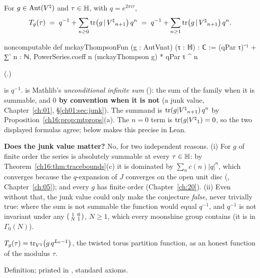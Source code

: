 \begin{definition}\label{ch16:def:mtfun}
For $g\in\operatorname{Aut}({V^{\natural}})$ and $\tau\in\mathbb{H}$, with $q=e^{2\pi i\tau}$,
\begin{equation*}
  T_g(\tau)\;=\;q^{-1}+\sum_{n\ge0}\operatorname{tr}\bigl(g\,|\,{V^{\natural}}_{n+1}\bigr)\,q^n
  \;=\;q^{-1}+\sum_{n\ge1}\operatorname{tr}\bigl(g\,|\,{V^{\natural}}_{n+1}\bigr)\,q^n .
\end{equation*}
\end{definition}
\begin{leancode}
noncomputable def mckayThompsonFun (g : AutVnat) (τ : ℍ) : ℂ :=
  (qPar τ)⁻¹ + ∑' n : ℕ, PowerSeries.coeff n (mckayThompson g) * qPar τ ^ n
\end{leancode}
(.)
\begin{dictionary}
 is $q^{-1}$.   is Mathlib's \emph{unconditional infinite sum} ():
the sum of the family when it is summable, and \textbf{$0$ by convention when it is not} (a junk value,
Chapter~\ref{ch:01}, \S\ref{ch01:sec:junk}).  The summand is $\operatorname{tr}(g|{V^{\natural}}_{n+1})\,q^n$ by
Proposition~\ref{ch16:prop:mtprops}(a).  The $n=0$ term is $\operatorname{tr}(g|{V^{\natural}}_1)=0$, so the two displayed formulas agree;
 below makes this precise in Lean.

\textbf{Does the junk value matter?}  No, for two independent reasons.  (i) For $g$ of finite order the series is
absolutely summable at every $\tau\in\mathbb{H}$: by Theorem~\ref{ch16:thm:tracebounds}(c) it is dominated by
$\sum_n c(n)|q|^n$, which converges because the $q$-expansion of $J$ converges on the open unit disc
(, Chapter~\ref{ch:05}); and every $g$ has finite order (Chapter~\ref{ch:20}).  (ii) Even
without that, the junk value could only make the conjecture \emph{false}, never trivially true: where the sum is not
summable the function would equal $q^{-1}$, and $q^{-1}$ is not invariant under any $\left(\begin{smallmatrix}1&0\\N&1\end{smallmatrix}\right)$, $N\ge1$,
which every moonshine group contains (it is in $\Gamma_0(N)$).
\end{dictionary}
\begin{physics}
$T_g(\tau)=\operatorname{tr}_{{V^{\natural}}}\bigl(g\,q^{L_0-1}\bigr)$, the twisted torus partition function, as an honest function of the
modulus $\tau$.
\end{physics}
\begin{status}
Definition; printed in , standard axioms.
\end{status}

